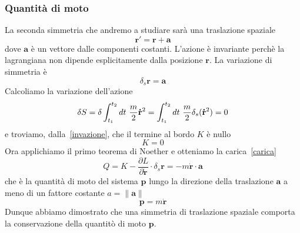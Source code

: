 \begin{example}
    \subsubsection{Quantità di moto}
        La seconda simmetria che andremo a studiare sarà una traslazione spaziale
    \begin{equation*}
        \mathbf r' = \mathbf r + \mathbf a
    \end{equation*}
        dove $\mathbf a$ è un vettore dalle componenti costanti. L'azione è invariante perchè la lagrangiana non dipende esplicitamente dalla posizione $\mathbf r$. La variazione di simmetria è 
    \begin{equation*}
        \delta_s \mathbf r = \mathbf a
    \end{equation*}
        Calcoliamo la variazione dell'azione
    \begin{equation*}
        \delta S = \delta \int_{t_1}^{t_2}dt~ \frac{m}{2} \mathbf{\dot r}^2 = \int_{t_1}^{t_2}dt~ \frac{m}{2} \delta_s (\mathbf{\dot r}^2) = 0
    \end{equation*}
        e troviamo, dalla~\eqref{invazione}, che il termine al bordo $K$ è nullo
    \begin{equation*}
        K = 0
    \end{equation*}
        Ora applichiamo il primo teorema di Noether e otteniamo la carica~\eqref{carica} 
    \begin{equation*}
        Q = K - \frac{\partial L}{\partial \mathbf{\dot r}} \cdot \delta_s \mathbf r = - m \mathbf{\dot r} \cdot \mathbf a
    \end{equation*}
        che è la quantità di moto del sistema $\mathbf p$ lungo la direzione della traslazione $\mathbf a$ a meno di un fattore costante $a = \|\mathbf a \|$
    \begin{equation*}
        \mathbf p = m \mathbf{\dot r}
    \end{equation*}
        Dunque abbiamo dimostrato che una simmetria di traslazione spaziale comporta la conservazione della quantitò di moto $\mathbf p$.


\end{example}
